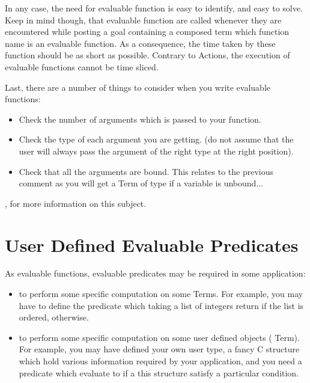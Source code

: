 In any case, the need for evaluable function is easy to identify, and
easy to solve. Keep in mind though, that evaluable function are called
whenever they are encountered while posting a goal containing a composed
term which function name is an evaluable function. As a consequence, the
time taken by these function should be as short as possible. Contrary to
Actions, the execution of evaluable functions cannot be time sliced.

Last, there are a number of things to consider when you write evaluable
functions:

\begin{itemize}

\item Check the number of arguments which is passed to your function.

\item Check the type of each argument you are getting. (do not assume
that the user will always pass the argument of the right type at the
right position).

\item Check that all the arguments are bound. This relates to the previous
comment as you will get a Term of type  if a variable is
unbound...

\end{itemize}

, for more information
on this subject.

\section{User Defined Evaluable Predicates}

As evaluable functions, evaluable predicates may be required in some
application:

\begin{itemize}

\item to perform some specific computation on some Terms. For example,
you may have to define the  predicate which taking a list
of integers return  if the list is ordered, 
otherwise.

\item to perform some specific computation on some user defined objects
( Term). For example, you may have defined your own user type, a
fancy C structure which hold various information required by your
application, and you need a predicate which evaluate to  if a
this structure satisfy a particular condition.

\end{itemize}

